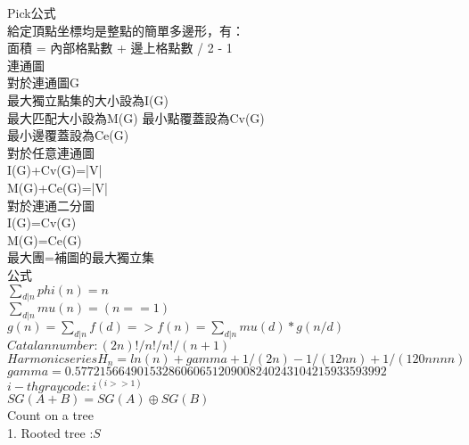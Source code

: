 Pick公式\\
給定頂點坐標均是整點的簡單多邊形，有：\\
面積 = 內部格點數 + 邊上格點數 / 2 - 1\\

連通圖\\
對於連通圖G\\
最大獨立點集的大小設為I(G)\\
最大匹配大小設為M(G)
最小點覆蓋設為Cv(G)\\
最小邊覆蓋設為Ce(G)\\
對於任意連通圖\\
I(G)+Cv(G)=|V|\\
M(G)+Ce(G)=|V|\\

對於連通二分圖\\
I(G)=Cv(G)\\
M(G)=Ce(G)\\

最大團=補圖的最大獨立集\\
公式\\
$\sum_{d|n} phi(n) = n$\\
$\sum_{d|n} mu(n) = (n==1)$\\
$g(n) = \sum_{d|n} f(d) => f(n) = \sum_{d|n} mu(d)*g(n/d)$\\
$Catalan number: (2n)!/n!/n!/(n+1)$\\
$Harmonic series H_n = ln(n) + gamma + 1/(2n) - 1/(12nn) + 1/(120nnnn)$\\
$gamma = 0.57721566490153286060651209008240243104215933593992$\\
$i-th gray code:i^{(i>>1)}$\\
$SG(A+B)=SG(A)\oplus SG(B)$\\

Count on a tree\\
1. Rooted tree :$S_{}$\\
